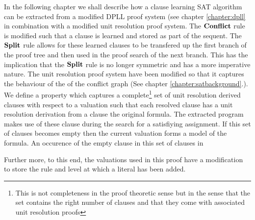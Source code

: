 \newcommand{\lit}[1]{\mathrm{Lit}(#1)}
\newcommand{\first}[1]{\mathrm{First}(#1)}
\newcommand{\second}[1]{\mathrm{Second}(#1)}
\newcommand{\extends}[2]{\mathrm{extends(#1,#2)}}
\newcommand{\UnitSub}{\dpllrule{UnitSub}}
\newcommand{\SplitSub}{\dpllrule{SplitSub}}
\newcommand{\complete}[3]{\mathrm{complete}(#1;#2; #3)}
\newcommand{\DeltaVec}{\overrightarrow{\Delta}}
\newcommand{\unitdec}[2]{(U \, #1 \, #2)}
\newcommand{\unitdecg}[1]{\unitdec{#1}{\delta(\Gamma)}}
\newcommand{\unitdecgone}[1]{\unitdec{#1}{\delta(\Gamma) + 1}}
\newcommand{\splitdec}[2]{(S \, #1 \, #2)}
\newcommand{\splitdecg}[1]{\splitdec{#1}{\delta(\Gamma)}}
\newcommand{\splitdecgone}[1]{\splitdec{#1}{\delta(\Gamma) + 1}}
\newcommand{\clmodres}[2]{\overset{#1;#2}{\underset{URes}{\vdash}}}


 \label{chapter:cdclproof}
In the following chapter we shall describe how a clause learning SAT algorithm can be extracted from a modified DPLL proof system (see chapter \ref{chapter:dpll} in combination with a modified unit resolution proof system. The $\mathbf{Conflict}$ rule is modified such that a clause is learned and stored as part of the sequent. The $\mathbf{Split}$ rule allows for these learned clauses to be transfered up the first branch of the proof tree and then used in the proof search of the next branch. This has the implication that the $\mathbf{Split}$ rule is no longer symmetric and has a more imperative nature. The unit resolution proof system have been modified so that it captures the behaviour of the of the conflict graph (See chapter \ref{chapter:satbackground}.). We define a property which captures a complete\footnote{This is not completeness in the proof theoretic sense but in the sense that the set contains the right number of clauses  and that they come with associated unit resolution proofs} set of unit resolution derived clauses with respect to a valuation such that each resolved clause has a unit resolution derivation from a clause the original formula. The extracted program makes use of these clause during the search for a satisfiying assignment. If this set of clauses becomes empty then the current valuation forms a model of the formula. An occurence of the empty clause in this set of clauses in

 Further more, to this end, the valuations used in this proof have a modification to store the rule and level at which a literal has been added. 


